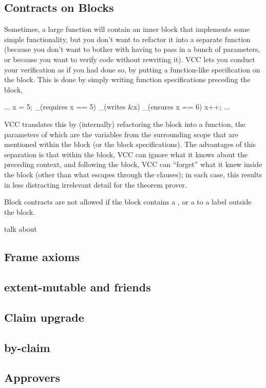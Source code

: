 \subsection{Contracts on Blocks} 

Sometimes, a large function will contain an inner block that
implements some simple functionality, but you don't want to refactor
it into a separate function (\eg because you don't want to bother with
having to pass in a bunch of parameters, or because you want to verify
code without rewriting it). VCC lets you conduct your verification as
if you had done so, by putting a function-like specification on the
block.
This is done by simply writing function specifications
preceding the block, \eg
\begin{VCC}
...
x = 5;
_(requires x == 5)
_(writes &x)
_(ensures x == 6)
{
  x++;
}
...
\end{VCC}
VCC translates this by (internally) refactoring the block into a
function, the parameters of which are the variables from the
surrounding scope that are mentioned within the block (or the block
specifications). The advantages of this separation is that within the block,
VCC can ignore what it knows about the preceding context, and
following the block, VCC can ``forget'' what it knew inside the block
(other than what escapes through the  clauses); in each
case, this results in less distracting irrelevant detail for the
theorem prover.

Block contracts are not allowed if the block contains a ,
or a  to a label outside the block.

\itodo{} talk about 

\subsection{Frame axioms}
\subsection{extent-mutable and friends}
\subsection{Claim upgrade}
\subsection{by-claim}
\subsection{Approvers}

